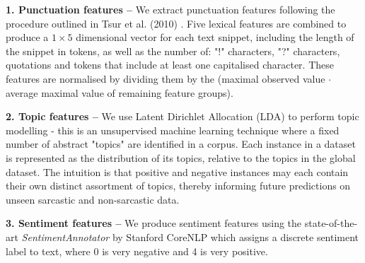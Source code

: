 \documentclass[12pt,a4paper]{article}
\begin{document}
\noindent \textbf{1. Punctuation features --} We extract punctuation features following the procedure outlined in Tsur et al. (2010) \cite{tsur2010icwsm}. Five lexical features are combined to produce a $ 1 \times 5 $ dimensional vector for each text snippet, including the length of the snippet in tokens, as well as the number of: "!" characters, "?" characters, quotations and tokens that include at least one capitalised character. These features are normalised by dividing them by the (maximal observed value $ \cdot $ average maximal value of remaining feature groups).\\\vspace{-5pt}


\noindent \textbf{2. Topic features --} We use Latent Dirichlet Allocation (LDA) to perform topic modelling - this is an unsupervised machine learning technique where a fixed number of abstract "topics" are identified in a corpus. Each instance in a dataset is represented as the distribution of its topics, relative to the topics in the global dataset. The intuition is that positive and negative instances may each contain their own distinct assortment of topics, thereby informing future predictions on unseen sarcastic and non-sarcastic data.\\\vspace{-5pt}

\noindent \textbf{3. Sentiment features --} We produce sentiment features using the state-of-the-art \textit{SentimentAnnotator} \cite{socher2013recursive} by Stanford CoreNLP \cite{manning2014stanford} which assigns a discrete sentiment label to text, where 0 is very negative and 4 is very positive.\\\vspace{-5pt}
\end{document}
